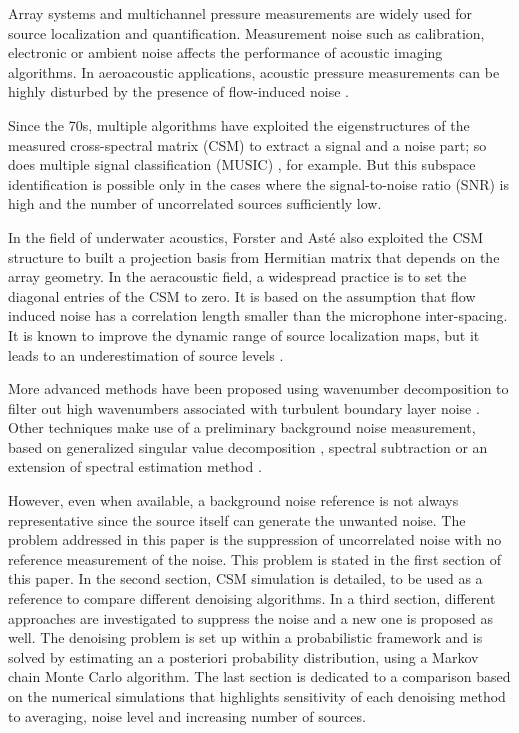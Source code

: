 \documentclass[fontsize=12pt,DIV13,paper=a4,abstract=true,titlepage=false]{scrartcl}
\begin{document}
Array systems and multichannel pressure measurements are widely used for source localization and quantification. Measurement noise such as calibration, electronic or ambient noise affects the performance of acoustic imaging algorithms. In aeroacoustic applications, acoustic pressure measurements can be highly disturbed by the presence of flow-induced noise \citep{Fenech2009}.

Since the 70s, multiple algorithms have exploited the eigenstructures of the measured cross-spectral matrix (CSM) to extract a signal and a noise part; so does multiple signal classification (MUSIC) \citep{Schmidt1986}, for example. But this subspace identification is possible only in the cases where the signal-to-noise ratio (SNR) is high and the number of uncorrelated sources sufficiently low.

In the field of underwater acoustics, Forster and Asté \citep{Forster1999} also exploited the CSM structure to built a projection basis from Hermitian matrix that depends on the array geometry. 
In the aeracoustic field, a widespread practice is to set the diagonal entries of the CSM to zero. It is based on the assumption that flow induced noise has a correlation length smaller than the microphone inter-spacing. It is known to improve the dynamic range of source localization maps, but it leads to an underestimation of source levels \citep{Dougherty2002a}.

More advanced methods have been proposed using wavenumber decomposition to filter out high wavenumbers associated with turbulent boundary layer noise \citep{Arguillat2010}. Other techniques make use of a preliminary background noise measurement, based on generalized singular value decomposition \citep{Bulte2007}, spectral subtraction \citep{Boll1979} or an extension of spectral estimation method \citep{Blacodon2010}.

However, even when available, a background noise reference is not always representative since the source itself can generate the unwanted noise. The problem addressed in this paper is the suppression of uncorrelated noise with no reference measurement of the noise. This problem is stated in the first section of this paper. In the second section, CSM simulation is detailed, to be used as a reference to compare different denoising algorithms. In a third section, different approaches are investigated  to suppress the noise and a new one is proposed as well.  The denoising problem is set up within a probabilistic framework and is solved by estimating an a posteriori probability distribution, using a Markov chain Monte Carlo algorithm. The last section is dedicated to a comparison based on the numerical simulations that highlights sensitivity of each denoising method to averaging, noise level and increasing number of sources.
\end{document}
